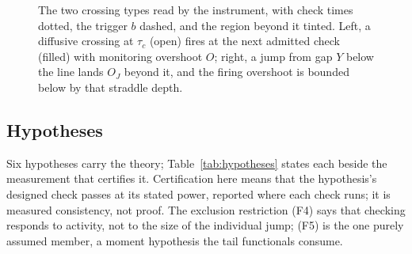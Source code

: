 \documentclass[11pt,a4paper]{article}
\theoremstyle{definition}
\theoremstyle{plain}
\theoremstyle{remark}
\newcommand{\tact}{t_{\mathrm{d}}}
\begin{document}
\begin{figure}[H]
\caption{The two crossing types read by the instrument, with check
times dotted, the trigger $b$ dashed, and the region beyond it
tinted. Left, a diffusive crossing at $\tau_c$ (open) fires at the
next admitted check (filled) with monitoring overshoot $O$; right, a
jump from gap $Y$ below the line lands $O_J$ beyond it, and the
firing overshoot is bounded below by that straddle depth.}
\label{fig:spectrometer}
\end{figure}

\subsection{Hypotheses}\label{sec:hypotheses}

Six hypotheses carry the theory;
Table~\ref{tab:hypotheses} states each beside the measurement that
certifies it. Certification here means that the hypothesis's
designed check passes at its stated power, reported where each
check runs; it is measured consistency, not proof. The exclusion restriction (F4) says that checking
responds to activity, not to the size of the individual jump; (F5)
is the one purely assumed member, a moment hypothesis the tail
functionals consume.
\end{document}
